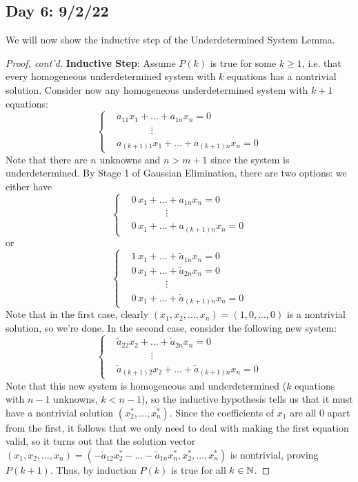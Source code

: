 \documentclass[main.tex]{subfiles}
\begin{document}
\subsection{Day 6: 9/2/22}

We will now show the inductive step of the Underdetermined System Lemma.

\begin{proof}[Proof, cont'd]
    \textbf{Inductive Step}: Assume $P(k)$ is true for some $k\ge 1$, i.e. that every homogeneous underdetermined system with $k$ equations has a nontrivial solution. Consider now any homogeneous underdetermined system with $k + 1$ equations:
    \[\left\{\begin{aligned}
        &a_{11}x_1 + \ldots + a_{1n}x_n = 0 \\
        &\phantom{hey guys}\vdots \\
        &a_{(k + 1)1}x_1 + \ldots + a_{(k + 1)n}x_n = 0
    \end{aligned}\right.\]
    Note that there are $n$ unknowns and $n > m + 1$ since the system is underdetermined. By Stage 1 of Gaussian Elimination, there are two options: we either have
    \[\left\{\begin{aligned}
        &\boxed{0}\,x_1 + \ldots + a_{1n}x_n = 0 \\
        &\phantom{hey guys}\vdots \\
        &\boxed{0}\,x_1 + \ldots + a_{(k + 1)n}x_n = 0
    \end{aligned}\right.\]
    or
    \[\left\{\begin{aligned}
        &\boxed{1}\,x_1 + \ldots + \tilde{a}_{1n}x_n = 0 \\
        &\boxed{0}\,x_1 + \ldots + \tilde{a}_{2n}x_n = 0 \\
        &\phantom{hey guys}\vdots \\
        &\boxed{0}\,x_1 + \ldots + \tilde{a}_{(k + 1)n}x_n = 0
    \end{aligned}\right.\]
    Note that in the first case, clearly $(x_1, x_2, \ldots , x_n) = (1, 0, \ldots , 0)$ is a nontrivial solution, so we're done. In the second case, consider the following new system:
    \[\left\{\begin{aligned}
        &\tilde{a}_{22}x_2 + \ldots + \tilde{a}_{2n}x_n = 0 \\
        &\phantom{hey guys}\vdots \\
        &\tilde{a}_{(k + 1)2}x_2 + \ldots + \tilde{a}_{(k + 1)n}x_n = 0
    \end{aligned}\right.\]
    Note that this new system is homogeneous and underdetermined ($k$ equations with $n - 1$ unknowns, $k < n - 1$), so the inductive hypothesis tells us that it must have a nontrivial solution $(x_2^*, \ldots , x_n^*)$. Since the coefficients of $x_1$ are all $0$ apart from the first, it follows that we only need to deal with making the first equation valid, so it turns out that the solution vector $(x_1, x_2, \ldots , x_n) = (-\tilde{a}_{12}x_2^* - \ldots - \tilde{a}_{1n}x_n^*, x_2^*, \ldots , x_n^*)$ is nontrivial, proving $P(k + 1)$. Thus, by induction $P(k)$ is true for all $k\in \mathbb N$.
\end{proof}
\end{document}

